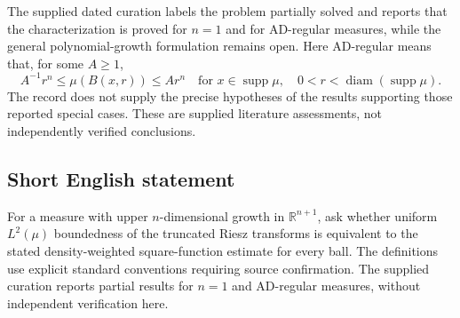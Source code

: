 \documentclass[11pt]{article}
\newcommand{\R}{\mathbb{R}}
\begin{document}
The supplied dated curation labels the problem partially solved and reports that the characterization is proved for \(n=1\) and for AD-regular measures, while the general polynomial-growth formulation remains open. Here AD-regular means that, for some \(A\geq1\),
\[
A^{-1}r^n\leq\mu(B(x,r))\leq Ar^n
\quad\text{for }x\in\operatorname{supp}\mu,
\quad 0<r<\operatorname{diam}(\operatorname{supp}\mu).
\]
The record does not supply the precise hypotheses of the results supporting those reported special cases. These are supplied literature assessments, not independently verified conclusions.
\subsection{Short English statement}
For a measure with upper \(n\)-dimensional growth in \(\R^{n+1}\), ask whether uniform \(L^2(\mu)\) boundedness of the truncated Riesz transforms is equivalent to the stated density-weighted square-function estimate for every ball. The definitions use explicit standard conventions requiring source confirmation. The supplied curation reports partial results for \(n=1\) and AD-regular measures, without independent verification here.
\end{document}

